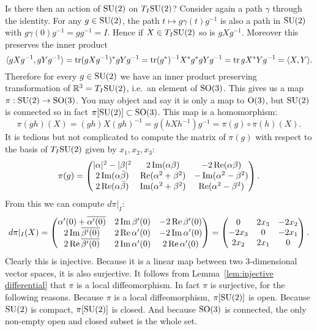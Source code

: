 Is there then an action of $\mathrm{SU}(2)$ on $T_I\mathrm{SU}(2)$?
Consider again a path $\gamma$ through the identity.
For any $g \in \mathrm{SU}(2)$, the path $t \mapsto g\gamma(t)g^{-1}$ is also a path in $\mathrm{SU}(2)$ with $g\gamma(0)g^{-1} = gg^{-1} = I$.
Hence if $X \in T_I\mathrm{SU}(2)$ so is $gXg^{-1}$.
Moreover this preserves the inner product
\[
\langle gXg^{-1}, gYg^{-1} \rangle
= \operatorname{tr} (gXg^{-1})^\ast gYg^{-1}
= \operatorname{tr} (g^\ast)^{-1}X^\ast g^\ast g Y g^{-1}
= \operatorname{tr} g X^\ast Y g^{-1}
= \langle X, Y \rangle.
\]
Therefore for every $g \in \mathrm{SU}(2)$ we have an inner product preserving transformation of $\mathbb{R}^3 = T_I\mathrm{SU}(2)$, i.e.\ an element of $\mathrm{SO}(3)$.
This gives us a map $\pi : \mathrm{SU}(2) \to \mathrm{SO}(3)$.
You may object and say it is only a map to $\mathrm{O}(3)$, but $\mathrm{SU}(2)$ is connected so in fact $\pi[\mathrm{SU}(2)] \subset \mathrm{SO}(3)$.
This map is a homomorphism:
\begin{equation}
\label{eq:su2 double cover homo}
\pi(gh)(X)
= (gh)X(gh)^{-1}
= g(hXh^{-1})g^{-1}
= \pi(g)\circ \pi(h)(X).
\end{equation}
It is tedious but not complicated to compute the matrix of $\pi(g)$ with respect to the basis of $T_I\mathrm{SU}(2)$ given by $x_1,x_2,x_3$:
\[
\pi(g)
= \begin{pmatrix}
|\alpha|^2 - |\beta|^2 &  2\operatorname{Im} (\alpha\beta) & -2\operatorname{Re}(\alpha\beta) \\
2\operatorname{Im} (\alpha\bar{\beta}) & \operatorname{Re}(\alpha^2 + \beta^2) & -\operatorname{Im}(\alpha^2 - \beta^2) \\
2\operatorname{Re}(\alpha\bar{\beta}) & \operatorname{Im}(\alpha^2 + \beta^2) & \operatorname{Re}(\alpha^2 - \beta^2)
\end{pmatrix}.
\]
From this we can compute $d\pi|_I$:
\[
d\pi|_I(X)
= \begin{pmatrix}
\alpha'(0) + \overline{\alpha'(0)} &  2\operatorname{Im} \beta'(0) & -2\operatorname{Re}\beta'(0) \\
2\operatorname{Im} \overline{\beta'(0)} & 2\operatorname{Re}\alpha'(0) & -2\operatorname{Im}\alpha'(0) \\
2\operatorname{Re} \overline{\beta'(0)} & 2\operatorname{Im}\alpha'(0) & 2\operatorname{Re}\alpha'(0)
\end{pmatrix}
= \begin{pmatrix}
0 &  2x_3 & -2x_2 \\
-2x_3 & 0 & -2x_1 \\
2x_2 & 2x_1 & 0
\end{pmatrix}.
\]
Clearly this is injective.
Because it is a linear map between two $3$-dimensional vector spaces, it is also surjective.
It follows from Lemma~\ref{lem:injective differential} that $\pi$ is a local diffeomorphism.
In fact $\pi$ is surjective, for the following reasons.
Because $\pi$ is a local diffeomorphism, $\pi[\mathrm{SU}(2)]$ is open.
Because $\mathrm{SU}(2)$ is compact, $\pi[\mathrm{SU}(2)]$ is closed.
And because $\mathrm{SO}(3)$ is connected, the only non-empty open and closed subset is the whole set.

